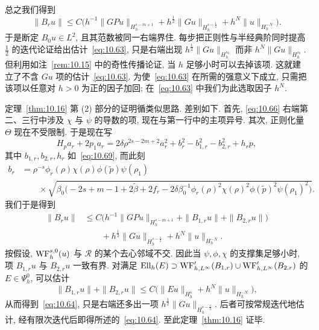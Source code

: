 总之我们得到
\begin{equation}\label{eq:10.74}
    \|B_r u\| \le C\bigl(h^{-1}\|G P u\|_{H_h^{s-m+1}} + h^{\frac{1}{2}}\|G u\|_{H_h^{s-\frac{1}{2}}} + h^N\|u\|_{H_h^{-N}}\bigr).
\end{equation}
于是断定 $B_0 u \in L^2$, 且其范数被同一右端界住. 每步把正则性与半经典阶同时提高 $\frac{1}{2}$ 的迭代论证给出估计~\eqref{eq:10.63}, 只是右端出现 $h^{\frac{1}{2}}\|G u\|_{H_h^{s_0}}$ 而非 $h^N\|G u\|_{H_h^{s_0}}$. 但利用如注~\ref{rem:10.15} 中的奇性传播论证, 当 $h$ 足够小时可以去掉该项. 这就建立了不含 $Gu$ 项的估计~\eqref{eq:10.63}. 为使~\eqref{eq:10.63} 在所需的强意义下成立, 只需把该项以任意对 $h > 0$ 为正的因子加回; 在~\eqref{eq:10.63} 中我们为此选取因子 $h^N$.

定理~\ref{thm:10.16} 第 (2) 部分的证明循类似思路. 差别如下. 首先, \eqref{eq:10.66} 右端第二、三行中涉及 $\chi$ 与 $\psi$ 的导数的项, 现在与第一行中的主项异号. 其次, 正则化量 $\Theta$ 现在不受限制. 于是现在写
\begin{equation}\label{eq:10.75}
    H_p a_r + 2p_1 a_r = 2\delta\rho^{2s-2m+2}a_r^2 + b_r^2 - b_{1,r}^2 - b_{2,r}^2 + h_r p,
\end{equation}
其中 $b_{1,r}, b_{2,r}, h_r$ 如~\eqref{eq:10.69}, 而此刻
\begin{equation}\label{eq:10.76}
    \begin{aligned}
        b_r &= \rho^{-s}\phi_r(\rho)\chi(\rho)\phi(\tilde{p})\psi(\rho_1) \\
        &\qquad \times \sqrt{\beta_0\bigl(-2s + m - 1 + 2\tilde{\beta} + 2f_r - 2\delta\beta_0^{-1}\phi_r(\rho)^2\chi(\rho)^2\phi(\tilde{p})^2\psi(\rho_1)^2\bigr)}.
    \end{aligned}
\end{equation}
我们于是得到
\begin{equation}\label{eq:10.77}
    \begin{aligned}
        \|B_r u\| &\le C\bigl(h^{-1}\|G P u\|_{H_h^{s-m+1}} + \|B_{1,r}u\| + \|B_{2,r}u\|\bigr) \\
        &\qquad + h^{\frac{1}{2}}\|G u\|_{H_h^{s-\frac{1}{2}}} + h^N\|u\|_{H_h^{-N}}.
    \end{aligned}
\end{equation}
按假设, $\operatorname{WF}_h^{s,0}(u)$ 与 $\mathcal{R}$ 的某个去心邻域不交. 因此当 $\psi, \phi, \chi$ 的支撑集足够小时, 项 $B_{1,r}u$ 与 $B_{2,r}u$ 一致有界. 对满足 $\operatorname{Ell}_h(E) \supset \operatorname{WF}_{h,L^\infty}'(B_{1,r}) \cup \operatorname{WF}_{h,L^\infty}'(B_{2,r})$ 的 $E \in \Psi_h^0$, 可以估计
\begin{equation}\label{eq:10.78}
    \|B_{1,r}u\| + \|B_{2,r}u\| \le C\bigl(\|E u\|_{H_h^s} + h^N\|u\|_{H_h^{-N}}\bigr),
\end{equation}
从而得到~\eqref{eq:10.64}, 只是右端还多出一项 $h^{\frac{1}{2}}\|G u\|_{H_h^{s-\frac{1}{2}}}$. 后者可按常规迭代地估计, 经有限次迭代后即得所述的~\eqref{eq:10.64}. 至此定理~\ref{thm:10.16} 证毕.

